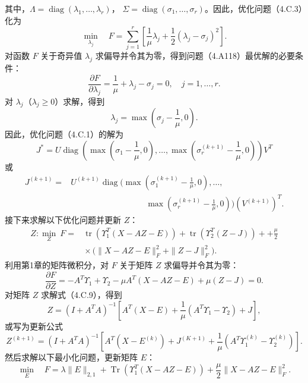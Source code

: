 其中，$\Lambda=\operatorname{diag}(\lambda_1,\ldots,\lambda_r)$，
$\Sigma=\operatorname{diag}(\sigma_1,\ldots,\sigma_r)$。因此，优化问题（4.C.3）化为
\begin{equation}
\min_{\lambda_j}\quad F=\sum_{j=1}^{r}
\left[\frac1\mu\lambda_j+\frac12(\lambda_j-\sigma_j)^2\right].\tag{4.C.7}
\end{equation}
对函数 $F$ 关于奇异值 $\lambda_j$ 求偏导并令其为零，得到问题（4.A118）最优解的必要条件：
\begin{equation}
\frac{\partial F}{\partial\lambda_j}=\frac1\mu+\lambda_j-\sigma_j=0,
\quad j=1,\ldots,r.\tag{4.C.8}
\end{equation}
对 $\lambda_j$（$\lambda_j\ge0$）求解，得到
\[
\lambda_j=\max\left(\sigma_j-\frac1\mu,0\right).
\]
因此，优化问题（4.C.1）的解为
\begin{equation}
J^*=U\operatorname{diag}\left(
\max\left(\sigma_1-\frac1\mu,0\right),\ldots,
\max\left(\sigma_r^{(k+1)}-\frac1\mu,0\right)\right)V^T\tag{4.C.9}
\end{equation}
或
\[
\begin{aligned}
J^{(k+1)}={}&U^{(k+1)}\operatorname{diag}\biggl(
\max\left(\sigma_1^{(k+1)}-\frac1\mu,0\right),\ldots,\\
&\hspace{9em}\max\left(\sigma_r^{(k+1)}-\frac1\mu,0\right)\biggr)(V^{(k+1)})^T.
\end{aligned}
\]
接下来求解以下优化问题并更新 $Z$：
\begin{equation}
\begin{aligned}
Z:\min_Z\ F={}&\operatorname{tr}(\Upsilon_1^T(X-AZ-E))
+\operatorname{tr}(\Upsilon_2^T(Z-J))++\frac\mu2\\
&{}\times\bigl(\|X-AZ-E\|_F^2+\|Z-J\|_F^2\bigr).
\end{aligned}\tag{4.C.10}
\end{equation}
利用第1章的矩阵微积分，对 $F$ 关于矩阵 $Z$ 求偏导并令其为零：
\begin{equation}
\frac{\partial F}{\partial Z}=-A^T\Upsilon_1+\Upsilon_2
-\mu A^T(X-AZ-E)+\mu(Z-J)=0.\tag{4.C.11}
\end{equation}
对矩阵 $Z$ 求解式（4.C.9），得到
\begin{equation}
Z=(I+A^TA)^{-1}\left[A^T(X-E)+\frac1\mu(A^T\Upsilon_1-\Upsilon_2)+J\right],\tag{4.C.12}
\end{equation}
或写为更新公式
\[
Z^{(k+1)}=(I+A^TA)^{-1}\left[
A^T(X-E^{(k)})+J^{(K+1)}+\frac1\mu(A^T\Upsilon_1^{(k)}-\Upsilon_2^{(k)})\right].
\]
然后求解以下最小化问题，更新矩阵 $E$：
\begin{equation}
\min_E\quad F=\lambda\|E\|_{2,1}
+\operatorname{Tr}(\Upsilon_1^T(X-AZ-E))
+\frac\mu2\|X-AZ-E\|_F^2.\tag{4.C.13}
\end{equation}
